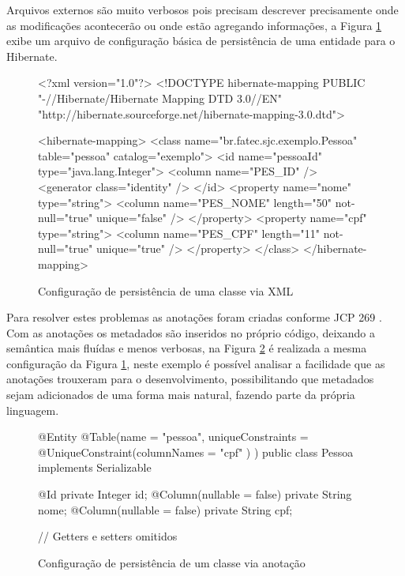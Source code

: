 Arquivos externos são muito verbosos pois precisam descrever precisamente onde as modificações acontecerão ou onde estão agregando informações, a Figura \ref{fig:arquivo-metadado} exibe um arquivo de configuração básica de persistência de uma entidade para o Hibernate.

\begin{figure}[H]
    \centering
    \begin{xml}
<?xml version="1.0"?>
<!DOCTYPE hibernate-mapping PUBLIC "-//Hibernate/Hibernate Mapping DTD 3.0//EN"
"http://hibernate.sourceforge.net/hibernate-mapping-3.0.dtd">

<hibernate-mapping>
    <class name="br.fatec.sjc.exemplo.Pessoa" table="pessoa" catalog="exemplo">
        <id name="pessoaId" type="java.lang.Integer">
            <column name="PES_ID" />
            <generator class="identity" />
        </id>
        <property name="nome" type="string">
            <column name="PES_NOME" length="50" not-null="true" unique="false" />
        </property>
        <property name="cpf" type="string">
            <column name="PES_CPF" length="11" not-null="true" unique="true" />
        </property>
    </class>
</hibernate-mapping>
    \end{xml}
    \caption{Configuração de persistência de uma classe via XML}
    \label{fig:arquivo-metadado}
\end{figure}

\par Para resolver estes problemas as anotações foram criadas conforme JCP 269 . Com as anotações os metadados são inseridos no próprio código, deixando a semântica mais fluídas e menos verbosas, na Figura \ref{fig:classe-metadado} é realizada a mesma configuração da Figura \ref{fig:arquivo-metadado}, neste exemplo é possível analisar a facilidade que as anotações trouxeram para o desenvolvimento, possibilitando que metadados sejam adicionados de uma forma mais natural, fazendo parte da própria linguagem.

\begin{figure}
    \centering
    \begin{java}
@Entity
@Table(name = "pessoa", uniqueConstraints = { @UniqueConstraint(columnNames = { "cpf" }) 
})
public class Pessoa implements Serializable {

	@Id
	private Integer id;
	@Column(nullable = false)
	private String nome;
	@Column(nullable = false)
	private String cpf;

    // Getters e setters omitidos

}
    \end{java}
    \caption{Configuração de persistência de um classe via anotação}
    \label{fig:classe-metadado}
\end{figure}

